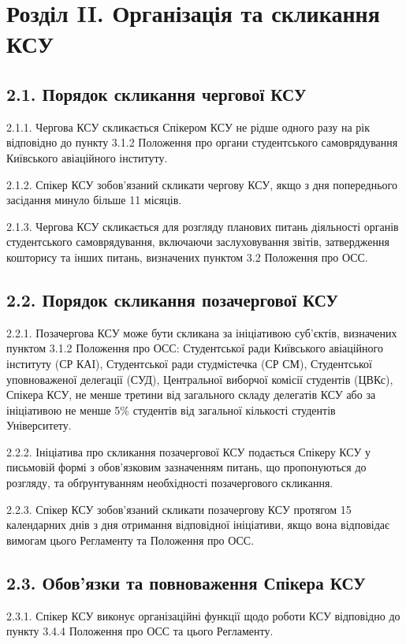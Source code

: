 \section*{Розділ II. Організація та скликання КСУ}

\subsection*{2.1. Порядок скликання чергової КСУ}
    2.1.1. Чергова КСУ скликається Спікером КСУ не рідше одного разу на рік відповідно до пункту 3.1.2 Положення про органи студентського самоврядування Київського авіаційного інституту.

    2.1.2. Спікер КСУ зобов'язаний скликати чергову КСУ, якщо з дня попереднього засідання минуло більше 11 місяців.

    2.1.3. Чергова КСУ скликається для розгляду планових питань діяльності органів студентського самоврядування, включаючи заслуховування звітів, затвердження кошторису та інших питань, визначених пунктом 3.2 Положення про ОСС.

\subsection*{2.2. Порядок скликання позачергової КСУ}
    2.2.1. Позачергова КСУ може бути скликана за ініціативою суб'єктів, визначених пунктом 3.1.2 Положення про ОСС: Студентської ради Київського авіаційного інституту (СР КАІ), Студентської ради студмістечка (СР СМ), Студентської уповноваженої делегації (СУД), Центральної виборчої комісії студентів (ЦВКс), Спікера КСУ, не менше третини від загального складу делегатів КСУ або за ініціативою не менше 5\% студентів від загальної кількості студентів Університету.

    2.2.2. Ініціатива про скликання позачергової КСУ подається Спікеру КСУ у письмовій формі з обов'язковим зазначенням питань, що пропонуються до розгляду, та обґрунтуванням необхідності позачергового скликання.

    2.2.3. Спікер КСУ зобов'язаний скликати позачергову КСУ протягом 15 календарних днів з дня отримання відповідної ініціативи, якщо вона відповідає вимогам цього Регламенту та Положення про ОСС.

\subsection*{2.3. Обов'язки та повноваження Спікера КСУ}
    2.3.1. Спікер КСУ виконує організаційні функції щодо роботи КСУ відповідно до пункту 3.4.4 Положення про ОСС та цього Регламенту.

